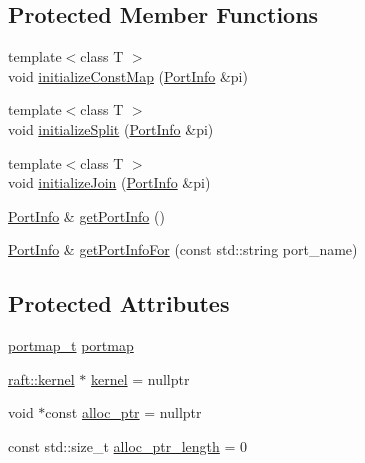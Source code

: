 \subsection*{Protected Member Functions}
\begin{DoxyCompactItemize}
\item 
{\footnotesize template$<$class T $>$ }\\void \hyperlink{class_port_a90a9a883b2e10871e7a8dc55ab0077f5}{initialize\+Const\+Map} (\hyperlink{struct_port_info}{Port\+Info} \&pi)
\item 
{\footnotesize template$<$class T $>$ }\\void \hyperlink{class_port_a7189f6823a0d240396210a7c317d4803}{initialize\+Split} (\hyperlink{struct_port_info}{Port\+Info} \&pi)
\item 
{\footnotesize template$<$class T $>$ }\\void \hyperlink{class_port_a179c9a36189eb621a5874a0741708e59}{initialize\+Join} (\hyperlink{struct_port_info}{Port\+Info} \&pi)
\item 
\hyperlink{struct_port_info}{Port\+Info} \& \hyperlink{class_port_a4af1cb062940ca3b83c569f024b9a8d1}{get\+Port\+Info} ()
\item 
\hyperlink{struct_port_info}{Port\+Info} \& \hyperlink{class_port_afb426a015195fa9b4b5b1d1200daf8ed}{get\+Port\+Info\+For} (const std\+::string port\+\_\+name)
\end{DoxyCompactItemize}
\subsection*{Protected Attributes}
\begin{DoxyCompactItemize}
\item 
\hyperlink{structportmap__t}{portmap\+\_\+t} \hyperlink{class_port_a537a8a0c2a47acbf8654f286200aee90}{portmap}
\item 
\hyperlink{classraft_1_1kernel}{raft\+::kernel} $\ast$ \hyperlink{class_port_ac17060db235459adaab87cdccb605884}{kernel} = nullptr
\item 
void $\ast$const \hyperlink{class_port_a78bf16e68f1dd5312f37b4e2806a9cf8}{alloc\+\_\+ptr} = nullptr
\item 
const std\+::size\+\_\+t \hyperlink{class_port_a98d2e7e0e570e082465c692083300fa9}{alloc\+\_\+ptr\+\_\+length} = 0
\end{DoxyCompactItemize}
